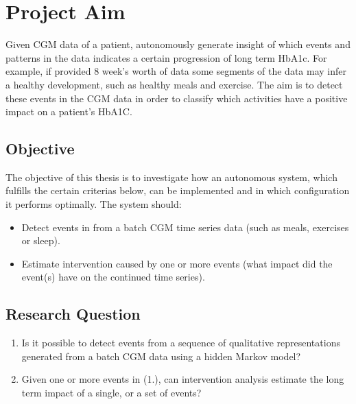 \section{Project Aim}

Given CGM data of a patient, autonomously generate insight of which events and patterns in the data indicates a certain progression of long term HbA1c.
For example, if provided 8 week's worth of data some segments of the data may infer a healthy development, such as healthy meals and exercise.
The aim is to detect these events in the CGM data in order to classify which activities have a positive impact on a patient's HbA1C.

\subsection{Objective}

The objective of this thesis is to investigate how an autonomous system, which fulfills the certain criterias below, can be implemented and in which configuration it performs optimally. The system should:
\begin{itemize}
  \item Detect events in from a batch CGM time series data (such as meals, exercises or sleep).
  \item Estimate intervention caused by one or more events (what impact did the event(s) have on the continued time series).
\end{itemize}

\subsection{Research Question}

\begin{enumerate}
  \item Is it possible to detect events from a sequence of qualitative representations generated from a batch CGM data using a hidden Markov model?
  \item Given one or more events in (1.), can intervention analysis estimate the long term impact of a single, or a set of events?
\end{enumerate}
